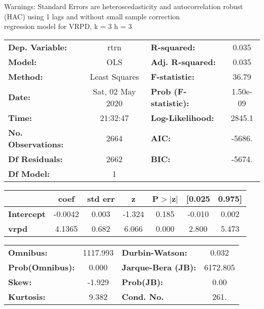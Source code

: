 Warnings: \newline
 [1] Standard Errors are heteroscedasticity and autocorrelation robust (HAC) using 1 lags and without small sample correction\\ 

regression model for VRPD, k = 3 h = 3\begin{center}
\begin{tabular}{lclc}
\toprule
\textbf{Dep. Variable:}    &       rtrn       & \textbf{  R-squared:         } &     0.035   \\
\textbf{Model:}            &       OLS        & \textbf{  Adj. R-squared:    } &     0.035   \\
\textbf{Method:}           &  Least Squares   & \textbf{  F-statistic:       } &     36.79   \\
\textbf{Date:}             & Sat, 02 May 2020 & \textbf{  Prob (F-statistic):} &  1.50e-09   \\
\textbf{Time:}             &     21:32:47     & \textbf{  Log-Likelihood:    } &    2845.1   \\
\textbf{No. Observations:} &        2664      & \textbf{  AIC:               } &    -5686.   \\
\textbf{Df Residuals:}     &        2662      & \textbf{  BIC:               } &    -5674.   \\
\textbf{Df Model:}         &           1      & \textbf{                     } &             \\
\bottomrule
\end{tabular}
\begin{tabular}{lcccccc}
                   & \textbf{coef} & \textbf{std err} & \textbf{z} & \textbf{P$> |$z$|$} & \textbf{[0.025} & \textbf{0.975]}  \\
\midrule
\textbf{Intercept} &      -0.0042  &        0.003     &    -1.324  &         0.185        &       -0.010    &        0.002     \\
\textbf{vrpd}      &       4.1365  &        0.682     &     6.066  &         0.000        &        2.800    &        5.473     \\
\bottomrule
\end{tabular}
\begin{tabular}{lclc}
\textbf{Omnibus:}       & 1117.993 & \textbf{  Durbin-Watson:     } &    0.032  \\
\textbf{Prob(Omnibus):} &   0.000  & \textbf{  Jarque-Bera (JB):  } & 6172.805  \\
\textbf{Skew:}          &  -1.929  & \textbf{  Prob(JB):          } &     0.00  \\
\textbf{Kurtosis:}      &   9.382  & \textbf{  Cond. No.          } &     261.  \\
\bottomrule
\end{tabular}
\end{center}

